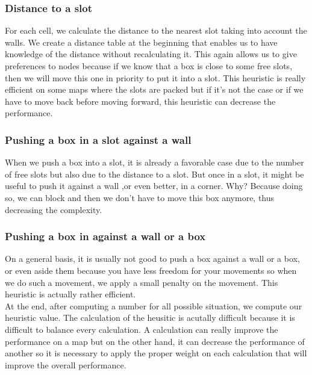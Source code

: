 \documentclass[journal]{IEEEtran}
\begin{document}
\subsubsection{Distance to a slot}
For each cell, we calculate the distance to the nearest slot taking into account the walls. We create a distance table at the beginning that enables us to have knowledge of the distance without recalculating it. This again allows us to give preferences to nodes because if we know that a box is close to some free slots, then we will move this one in priority to put it into a slot. This heuristic is really efficient on some maps where the slots are packed but if it's not the case or if we have to move back before moving forward, this heuristic can decrease the performance.

\subsubsection{Pushing a box in a slot against a wall}
When we push a box into a slot, it is already a favorable case due to the number of free slots but also due to the distance to a slot. But once in a slot, it might be useful to push it against a wall ,or even better, in a corner. Why? Because doing so, we can block and then we don't have to move this box anymore, thus decreasing the complexity.

\subsubsection{Pushing a box in against a wall or a box}
On a general basis, it is usually not good to push a box against a wall or a box, or even aside them because you have less freedom for your movements so when we do such a movement, we apply a small penalty on the movement. This heuristic is actually rather efficient.\\

At the end, after computing a number for all possible situation, we compute our heuristic value. The calculation of the heusitic is acutally difficult because it is difficult to balance every calculation. A calculation can really improve the performance on a map but on the other hand, it can decrease the performance of another so it is necessary to apply the proper weight on each calculation that will improve the overall performance.

\end{document}
